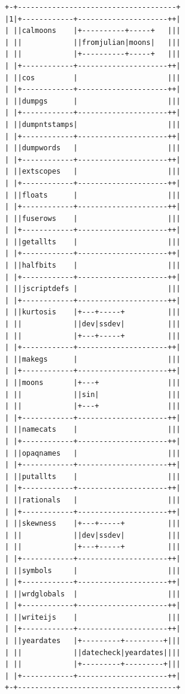 \documentclass[11pt,letter,landscape]{article}
\begin{document}
    \begin{Verbatim}[commandchars=\\\{\}]
+-+-------------------------------------+
|1|+------------+---------------------++|
| ||calmoons    |+----------+-----+   |||
| ||            ||fromjulian|moons|   |||
| ||            |+----------+-----+   |||
| |+------------+---------------------++|
| ||cos         |                     |||
| |+------------+---------------------++|
| ||dumpgs      |                     |||
| |+------------+---------------------++|
| ||dumpntstamps|                     |||
| |+------------+---------------------++|
| ||dumpwords   |                     |||
| |+------------+---------------------++|
| ||extscopes   |                     |||
| |+------------+---------------------++|
| ||floats      |                     |||
| |+------------+---------------------++|
| ||fuserows    |                     |||
| |+------------+---------------------++|
| ||getallts    |                     |||
| |+------------+---------------------++|
| ||halfbits    |                     |||
| |+------------+---------------------++|
| ||jscriptdefs |                     |||
| |+------------+---------------------++|
| ||kurtosis    |+---+-----+          |||
| ||            ||dev|ssdev|          |||
| ||            |+---+-----+          |||
| |+------------+---------------------++|
| ||makegs      |                     |||
| |+------------+---------------------++|
| ||moons       |+---+                |||
| ||            ||sin|                |||
| ||            |+---+                |||
| |+------------+---------------------++|
| ||namecats    |                     |||
| |+------------+---------------------++|
| ||opaqnames   |                     |||
| |+------------+---------------------++|
| ||putallts    |                     |||
| |+------------+---------------------++|
| ||rationals   |                     |||
| |+------------+---------------------++|
| ||skewness    |+---+-----+          |||
| ||            ||dev|ssdev|          |||
| ||            |+---+-----+          |||
| |+------------+---------------------++|
| ||symbols     |                     |||
| |+------------+---------------------++|
| ||wrdglobals  |                     |||
| |+------------+---------------------++|
| ||writeijs    |                     |||
| |+------------+---------------------++|
| ||yeardates   |+---------+---------+|||
| ||            ||datecheck|yeardates||||
| ||            |+---------+---------+|||
| |+------------+---------------------++|
+-+-------------------------------------+
    \end{Verbatim}
\end{document}
